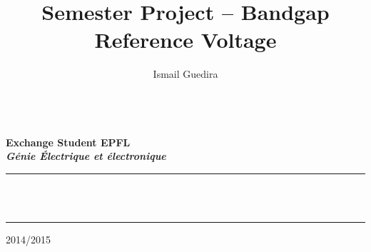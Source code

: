 \documentclass[11pt,a4paper]{report}
\title{Semester Project -- Bandgap Reference Voltage}
\author{Ismail Guedira}
\begin{document}

 \makeatletter
   \begin{titlepage}
  \centering
% 
% 
% 
\hfill \Large   \textsc{\@author} \hfill \\ 
\hfill \normalsize \bfseries Exchange Student EPFL \\
\hfill \normalsize \it Génie Électrique et électronique \\ 
\vfill


 
     \hrule
     \vspace{2em}
     \LARGE \textbf{} \\
     \vspace{2em}
     \Large \textbf{\@title} \\
     \vspace{2em}
     \hrule
    
        
    
% 
% 
% 
     \vfill
% 
      {\Large \textsc{2014/2015}  \hfill \Large \textsc{\@date}} \\
% 
% 
  \end{titlepage}
\makeatother
\end{document}
